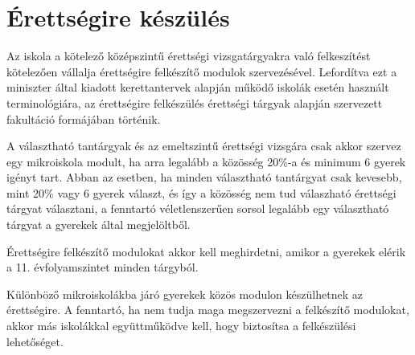 \section{Érettségire készülés}
\label{sec:erettsegi}

Az iskola a kötelező középszintű érettségi vizsgatárgyakra való
felkeszítést kötelezően vállalja érettségire felkészítő modulok
szervezésével. Lefordítva ezt a miniszter által kiadott kerettantervek alapján
működő iskolák esetén használt terminológiára, az érettségire felkészülés
érettségi tárgyak alapján szervezett fakultáció formájában történik.

A választható tantárgyak és az emeltszintű érettségi vizsgára csak akkor
szervez egy mikroiskola modult, ha arra legalább a közösség 20\%-a és minimum 6
gyerek igényt tart. Abban az esetben, ha minden választható tantárgyat csak
kevesebb, 
mint 20\% vagy 6 gyerek választ, és így a közösség nem tud válaszható érettségi
tárgyat választani, a fenntartó véletlenszerűen sorsol legalább egy választható
tárgyat
a gyerekek által megjelöltből.

Érettségire felkészítő modulokat akkor kell meghirdetni, amikor a gyerekek
elérik a 11. évfolyamszintet minden tárgyból.

Különböző mikroiskolákba járó gyerekek közös modulon készülhetnek az
érettségire. A fenntartó, ha nem tudja maga megszervezni a felkészítő modulokat, akkor más iskolákkal
együttműködve kell, hogy biztosítsa a felkészülési lehetőséget.